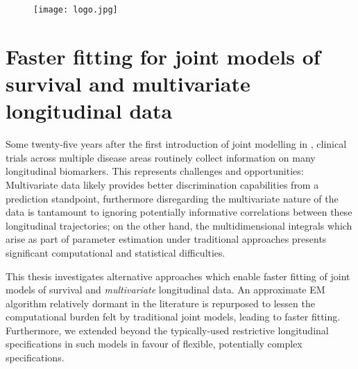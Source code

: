 \documentclass{article}
\begin{document}
    \begin{figure}
        \centering
        \texttt{[image: logo.jpg]}
    \end{figure}
    \section*{Faster fitting for joint models of survival and multivariate longitudinal data}

    Some twenty-five years after the first introduction of joint modelling in \citet{Wulfsohn97}, clinical trials across multiple disease areas routinely collect information on many longitudinal biomarkers. This represents challenges and opportunities: Multivariate data likely provides better discrimination capabilities from a prediction standpoint, furthermore disregarding the multivariate nature of the data is tantamount to ignoring potentially informative correlations between these longitudinal trajectories; on the other hand, the multidimensional integrals which arise as part of parameter estimation under traditional approaches presents significant computational and statistical difficulties.

    This thesis investigates alternative approaches which enable faster fitting of joint models of survival and \textit{multivariate} longitudinal data. An approximate EM algorithm relatively dormant in the literature \citep{Bernhardt15} is repurposed to lessen the computational burden felt by traditional joint models, leading to faster fitting. Furthermore, we extended beyond the typically-used restrictive longitudinal specifications in such models in favour of flexible, potentially complex specifications.
    
    
    
\end{document}
